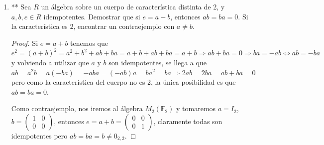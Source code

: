 \documentclass[paper=a4, fontsize=11pt, spanish]{scrartcl}
\begin{document}
\begin{enumerate}
\begin{proof}
			Veamos ahora que no sólo $m(X)$ divide al polinomio característico sino que es su único factor
			irreducible, esto es, el polinomio característico de $T$ es de la forma $(m(X))^n$ para algún $n
			\in \mathbb{N}$.
			
			Sea el polinomio $p(X)$ un factor irreducible del polinomio característico, entonces se tiene que
			tiene una raíz $\alpha$ en la clausura algebraica de $K$. Esto equivale a tener un vector propio
			$\lambda$ con coeficientes en la clausura de $K$ cumpliendo $T\lambda = \alpha\lambda$.
			
			Aplicando el polinomio mínimo al vector, tenemos que $0 = m(T)\lambda = m(\alpha)\lambda \Rightarrow
			\alpha$ es una raíz en la clausura algebraica de $m(X)$. Por tanto, $p(X)$ es un factor irreducible
			de $m(X)$, que también es irreducible, lo que nos lleva a que $m(X) = p(X) \Rightarrow$ el polinomio
			característico de $T$ sólo tiene a $m(X)$ como único factor irreducible, es decir, es de la forma
			$(m(X))^n$.
			
			Por último, como el grado del polinomio característico tiene el mismo valor que la dimensión del
			espacio en que se genera, calcularemos la $dim_K(V)$. Por la construcción que hicimos de $V$ con
			$V_1, V_2, \dots, V_t$ y que $V_i \cong F = K[X]/_{(m(X))} \Rightarrow dim_K(V) = t \cdot dim_K (V_i)
			= t \cdot dim_K(F) = t \cdot gr(m(X)) \Rightarrow (m(X))^t$ es el polinomio característico.
		\end{proof}
		
		\item ** Sea $R$ un álgebra sobre un cuerpo de característica distinta de 2, y $a, b, e \in R$
		idempotentes. Demostrar que si $e = a + b$, entonces $ab = ba = 0$. Si la característica es 2,
		encontrar un contraejemplo con $a \neq b$.
		\begin{proof}
			Si $e = a+b$ tenemos que $e^2 = (a+b)^2 = a^2 + b^2 + ab + ba = a + b + ab + ba = a+b \Rightarrow
			ab + ba = 0 \Rightarrow ba = -ab \Leftrightarrow ab = -ba$ y volviendo a utilizar que $a$ y $b$ son
			idempotentes, se llega a que $ab = a^2b = a(-ba) = -aba = (-ab)a = ba^2 = ba \Rightarrow 2ab = 2ba
			= ab + ba = 0$ pero como la característica del cuerpo no es 2, la única posibilidad es que $ab = ba
			= 0$.
			
			Como contraejemplo, nos iremos al álgebra $M_2(\mathbb{F}_2)$ y tomaremos $a = I_2$, $\displaystyle
			b = \begin{pmatrix} 1 & 0 \\ 0 & 0 \end{pmatrix}$, entonces $\displaystyle e = a+b = \begin{pmatrix}
			0 & 0 \\ 0 & 1 \end{pmatrix}$, claramente todas son idempotentes pero $ab = ba = b \neq 0_{2,2}$.
		\end{proof}
	

\end{enumerate}
\end{document}

